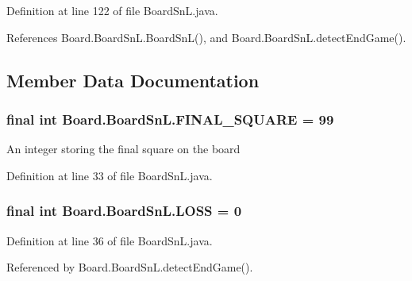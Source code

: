Definition at line 122 of file Board\+Sn\+L.\+java.



References Board.\+Board\+Sn\+L.\+Board\+Sn\+L(), and Board.\+Board\+Sn\+L.\+detect\+End\+Game().



\subsection{Member Data Documentation}
\hypertarget{class_board_1_1_board_sn_l_a133b0d6726fc954ea12a66b4369e3fa6}{}
\subsubsection[{F\+I\+N\+A\+L\+\_\+\+S\+Q\+U\+A\+R\+E}]{\setlength{\rightskip}{0pt plus 5cm}final int Board.\+Board\+Sn\+L.\+F\+I\+N\+A\+L\+\_\+\+S\+Q\+U\+A\+R\+E = 99\hspace{0.3cm}{\ttfamily [private]}}\label{class_board_1_1_board_sn_l_a133b0d6726fc954ea12a66b4369e3fa6}
An integer storing the final square on the board 

Definition at line 33 of file Board\+Sn\+L.\+java.

\hypertarget{class_board_1_1_board_sn_l_aa6138411eddcd92ae999cff9fc34acb7}{}
\subsubsection[{L\+O\+S\+S}]{\setlength{\rightskip}{0pt plus 5cm}final int Board.\+Board\+Sn\+L.\+L\+O\+S\+S = 0\hspace{0.3cm}{\ttfamily [private]}}\label{class_board_1_1_board_sn_l_aa6138411eddcd92ae999cff9fc34acb7}


Definition at line 36 of file Board\+Sn\+L.\+java.



Referenced by Board.\+Board\+Sn\+L.\+detect\+End\+Game().

\hypertarget{class_board_1_1_board_sn_l_a98423adeb63e796de2d496689b4ce8e1}{}
